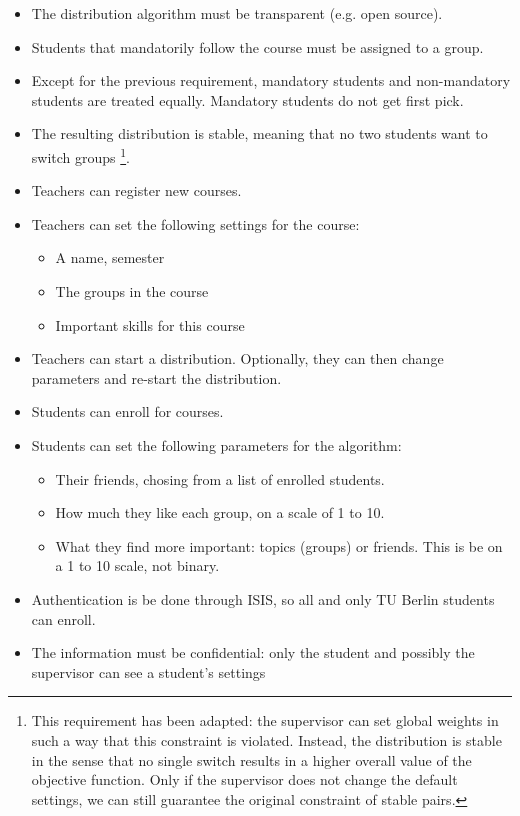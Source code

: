 \begin{itemize}
	\item The distribution algorithm must be transparent (e.g. open source).
	\item Students that mandatorily follow the course must be assigned to a group.
	\item Except for the previous requirement, mandatory students and non-mandatory students are treated equally. Mandatory students do not get first pick.
	\item The resulting distribution is stable, meaning that no two students want to switch groups
	\footnote{This requirement has been adapted: the supervisor can set global weights in such a way that this constraint is violated. Instead, the distribution is stable in the sense that no single switch results in a higher overall value of the objective function. Only if the supervisor does not change the default settings, we can still guarantee the original constraint of stable pairs.}.
	
	\item Teachers can register new courses.
	\item Teachers can set the following settings for the course:
		\begin{itemize}
			\item A name, semester
			\item The groups in the course
			\item Important skills for this course
		\end{itemize}
	\item Teachers can start a distribution. Optionally, they can then change parameters and re-start the distribution.
	
	\item Students can enroll for courses.
	\item Students can set the following parameters for the algorithm:
		\begin{itemize}
			\item Their friends, chosing from a list of enrolled students.
			\item How much they like each group, on a scale of 1 to 10.
			\item What they find more important: topics (groups) or friends. This is be on a 1 to 10 scale, not binary.
		\end{itemize}

	\item Authentication is be done through ISIS, so all and only TU Berlin students can enroll.
	\item The information must be confidential: only the student and possibly the supervisor can see a student's settings
\end{itemize}

